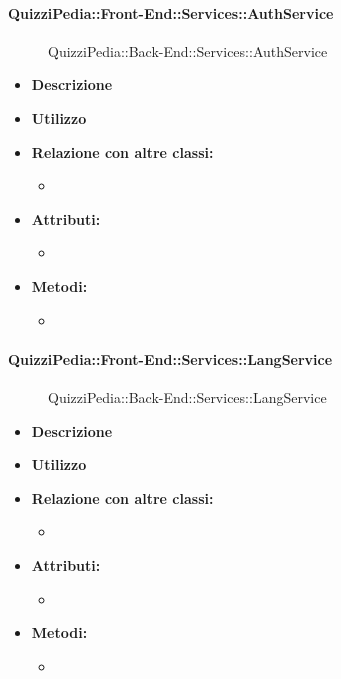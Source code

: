 \paragraph{QuizziPedia::Front-End::Services::AuthService}
\begin{figure}
	\centering
	\caption{QuizziPedia::Back-End::Services::AuthService}
\end{figure}
\begin{itemize}
	\item \textbf{Descrizione} \\ 
	\item \textbf{Utilizzo} \\
	\item \textbf{Relazione con altre classi:}
	\begin{itemize}
		\item 
	\end{itemize}
	\item \textbf{Attributi:}
	\begin{itemize}
		\item 
	\end{itemize}
	\item \textbf{Metodi:}
	\begin{itemize}
		\item 
	\end{itemize}
\end{itemize}

\paragraph{QuizziPedia::Front-End::Services::LangService}
\begin{figure}
	\centering
	\caption{QuizziPedia::Back-End::Services::LangService}
\end{figure}
\begin{itemize}
	\item \textbf{Descrizione} \\ 
	\item \textbf{Utilizzo} \\
	\item \textbf{Relazione con altre classi:}
	\begin{itemize}
		\item 
	\end{itemize}
	\item \textbf{Attributi:}
	\begin{itemize}
		\item 
	\end{itemize}
	\item \textbf{Metodi:}
	\begin{itemize}
		\item 
	\end{itemize}
\end{itemize}

